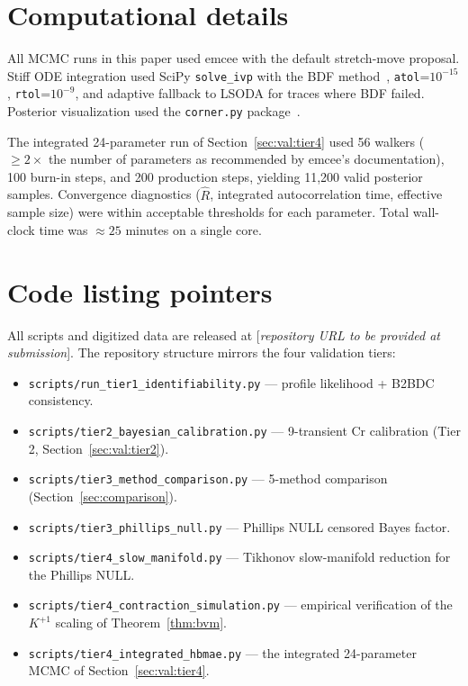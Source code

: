 \documentclass[12pt]{article}
\theoremstyle{plain}
\theoremstyle{definition}
\theoremstyle{remark}
\begin{document}
\section{Computational details}\label{app:computation}

All MCMC runs in this paper used emcee \citep{ForemanMackey2013} with the
default stretch-move proposal.  Stiff ODE integration used SciPy
\texttt{solve\_ivp} with the BDF method~\citep{Hindmarsh2005},
\texttt{atol}=$10^{-15}$, \texttt{rtol}=$10^{-9}$, and adaptive fallback to
LSODA for traces where BDF failed.  Posterior visualization used the
\texttt{corner.py} package~\citep{ForemanMackey2016}.

The integrated 24-parameter run of Section~\ref{sec:val:tier4} used 56
walkers ($\ge 2\times$ the number of parameters as recommended by emcee's
documentation), 100 burn-in steps, and 200 production steps, yielding
11,200 valid posterior samples.  Convergence diagnostics ($\widehat{R}$,
integrated autocorrelation time, effective sample size) were within
acceptable thresholds for each parameter.  Total wall-clock time was
$\approx 25$ minutes on a single core.

\section{Code listing pointers}\label{app:code}

All scripts and digitized data are released at
[\textit{repository URL to be provided at submission}].  The repository
structure mirrors the four validation tiers:
%
\begin{itemize}
\item \texttt{scripts/run\_tier1\_identifiability.py} --- profile likelihood +
B2BDC consistency.
\item \texttt{scripts/tier2\_bayesian\_calibration.py} --- 9-transient Cr
calibration (Tier 2, Section~\ref{sec:val:tier2}).
\item \texttt{scripts/tier3\_method\_comparison.py} --- 5-method comparison
(Section~\ref{sec:comparison}).
\item \texttt{scripts/tier3\_phillips\_null.py} --- Phillips NULL censored
Bayes factor.
\item \texttt{scripts/tier4\_slow\_manifold.py} --- Tikhonov slow-manifold
reduction for the Phillips NULL.
\item \texttt{scripts/tier4\_contraction\_simulation.py} --- empirical
verification of the $K^{+1}$ scaling of Theorem~\ref{thm:bvm}.
\item \texttt{scripts/tier4\_integrated\_hbmae.py} --- the integrated
24-parameter MCMC of Section~\ref{sec:val:tier4}.
\end{itemize}
\end{document}
